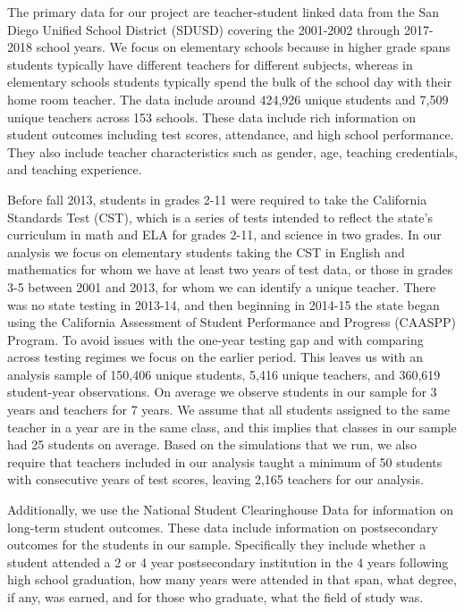 \documentclass[letterpaper,12pt]{article}
\begin{document}
The primary data for our project are teacher-student linked data from the San Diego Unified School District (SDUSD) covering the 2001-2002 through 2017-2018 school years. We focus on elementary schools because in higher grade spans students typically have different teachers for different subjects, whereas in elementary schools students typically spend the bulk of the school day with their home room teacher. The data include around 424,926 unique students and 7,509 unique teachers across 153 schools. These data include rich information on student outcomes including test scores, attendance, and high school performance. They also include teacher characteristics such as gender, age, teaching credentials, and teaching experience.

Before fall 2013, students in grades 2-11 were required to take the California Standards Test (CST), which is a series of tests intended to reflect the state's curriculum in math and ELA for grades 2-11, and science in two grades. In our analysis we focus on elementary students taking the CST in English and mathematics for whom we have at least two years of test data, or those in grades 3-5 between 2001 and 2013, for whom we can identify a unique teacher. There was no state testing in 2013-14, and then beginning in 2014-15 the state began using  the California Assessment of Student Performance and Progress (CAASPP) Program. To avoid issues with the one-year testing gap and with comparing across testing regimes we focus on the earlier period. This leaves us with an analysis sample of 150,406 unique students, 5,416 unique teachers, and 360,619 student-year observations. On average we observe students in our sample for 3 years and teachers for 7 years. We assume that all students assigned to the same teacher in a year are in the same class, and this implies that classes in our sample had 25 students on average. Based on the simulations that we run, we also require that teachers included in our analysis taught a minimum of 50 students with consecutive years of test scores, leaving 2,165 teachers for our analysis.

Additionally, we use the National Student Clearinghouse Data for information on long-term student outcomes. These data include information on postsecondary outcomes for the students in our sample. Specifically they include whether a student attended a 2 or 4 year postsecondary institution in the 4 years following high school graduation, how many years were attended in that span, what degree, if any, was earned, and for those who graduate, what the field of study was.
\end{document}
